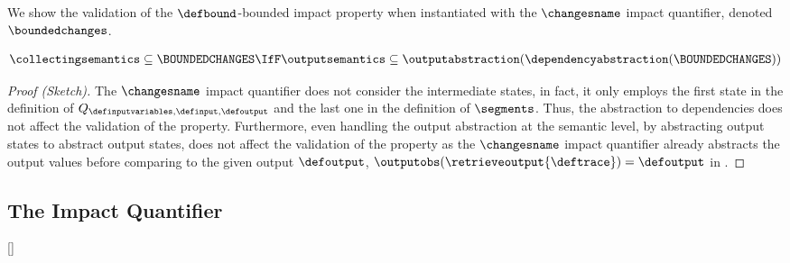 We show the validation of the $\defbound$-bounded impact property when instantiated with the $\changesname$ impact quantifier,
denoted $\boundedchanges$.

\begin{lemma}
  \begin{align*}
    \collectingsemantics \subseteq \BOUNDEDCHANGES \IfF \outputsemantics \subseteq \outputabstraction(\dependencyabstraction(\BOUNDEDCHANGES))
  \end{align*}
\end{lemma}
\begin{proof}[Proof (Sketch)]
  The $\changesname$ impact quantifier does not consider the intermediate states, in fact, it only employs the first state in the definition of $Q_{\definputvariables, \definput, \defoutput}$ and the last one in the definition of $\segments$.
  Thus, the abstraction to dependencies does not affect the validation of the property.
  Furthermore, even handling the output abstraction at the semantic level, by abstracting output states to abstract output states, does not affect the validation of the property as the $\changesname$ impact quantifier already abstracts the output values before comparing to the given output $\defoutput$, \cf{} $\outputobs(\retrieveoutput{\deftrace}) = \defoutput$ in .
\end{proof}



\subsection{The \qlibraname{} Impact Quantifier}[\qlibraname]

